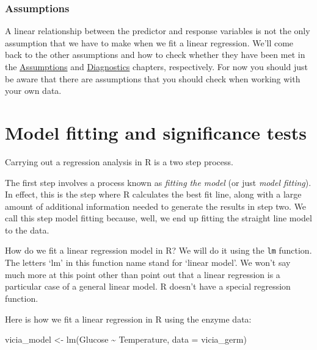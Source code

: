 \documentclass[
]{book}
\newenvironment{Shaded}{\begin{snugshade}}{\end{snugshade}}
\newcommand{\AttributeTok}[1]{\textcolor[rgb]{0.77,0.63,0.00}{#1}}
\newcommand{\FunctionTok}[1]{\textcolor[rgb]{0.00,0.00,0.00}{#1}}
\newcommand{\NormalTok}[1]{#1}
\newcommand{\OtherTok}[1]{\textcolor[rgb]{0.56,0.35,0.01}{#1}}
\newcommand{\SpecialCharTok}[1]{\textcolor[rgb]{0.00,0.00,0.00}{#1}}
\newenvironment{greybox}{
  \definecolor{shadecolor}{rgb}{0.95,0.95,0.95}  %
  \color{black}
  \begin{shaded}}
 {\end{shaded}}
\newenvironment{infobox}[1]
  {
  \begin{itemize}
  \renewcommand{\labelitemi}{
    \raisebox{-.7\height}[0pt][0pt]{
      {\setkeys{Gin}{width=3em,keepaspectratio}
        \texttt{[image: images/\#1]}}
    }
  }
  \setlength{\fboxsep}{1em}
  \begin{greybox}
  \item
  }
  {
  \end{greybox}
  \end{itemize}
  }
\begin{document}
\begin{infobox}{warning}

\hypertarget{assumptions}{%
\subsubsection*{Assumptions}\label{assumptions}}

A linear relationship between the predictor and response variables is not the only assumption that we have to make when we fit a linear regression. We'll come back to the other assumptions and how to check whether they have been met in the \protect\hyperlink{assumptions-diagnostics}{Assumptions} and \protect\hyperlink{regression-diagnostics}{Diagnostics} chapters, respectively. For now you should just be aware that there are assumptions that you should check when working with your own data.

\end{infobox}

\hypertarget{model-fitting-and-significance-tests}{%
\section{Model fitting and significance tests}\label{model-fitting-and-significance-tests}}

Carrying out a regression analysis in R is a two step process.

The first step involves a process known as \emph{fitting the model} (or just \emph{model fitting}). In effect, this is the step where R calculates the best fit line, along with a large amount of additional information needed to generate the results in step two. We call this step model fitting because, well, we end up fitting the straight line model to the data.

How do we fit a linear regression model in R? We will do it using the \texttt{lm} function. The letters `lm' in this function name stand for `linear model'. We won't say much more at this point other than point out that a linear regression is a particular case of a general linear model. R doesn't have a special regression function.

Here is how we fit a linear regression in R using the enzyme data:

\begin{Shaded}
\begin{Highlighting}[]
\NormalTok{vicia\_model }\OtherTok{\textless{}{-}} \FunctionTok{lm}\NormalTok{(Glucose }\SpecialCharTok{\textasciitilde{}}\NormalTok{ Temperature, }\AttributeTok{data =}\NormalTok{ vicia\_germ)}
\end{Highlighting}
\end{Shaded}
\end{document}
